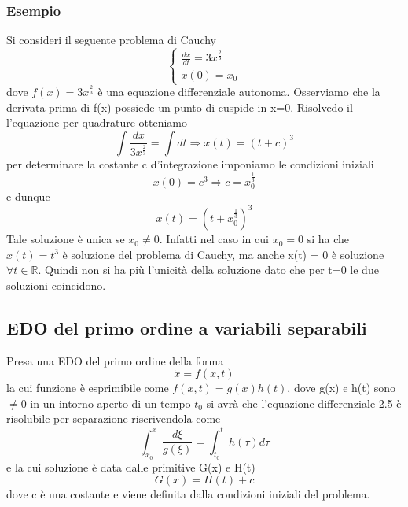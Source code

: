\subsubsection{Esempio}
Si consideri il seguente problema di Cauchy
\begin{equation*}
	\left \{ \begin{array}{l}
		\frac{dx}{dt} = 3x^{\frac{2}{3}} \\[0.2in]
		x(0) = x_0
	\end{array} \right.
\end{equation*}
dove $f(x) = 3x^{\frac{2}{3}}$ \`{e} una equazione differenziale autonoma. Osserviamo che la derivata prima di f(x) possiede un punto di cuspide in x=0. Risolvedo il l'equazione per quadrature otteniamo
\begin{equation*}
	\int \frac{dx}{3x^{\frac{2}{3}}} = \int dt \Rightarrow x(t) = (t+c)^3
\end{equation*}
per determinare la  costante c d'integrazione imponiamo le condizioni iniziali 
\begin{equation*}
	x(0) = c^3 \Rightarrow c = x_0^{\frac{1}{3}}
\end{equation*}
e dunque 
\begin{equation*}
	x(t) = (t + x_{0}^{\frac{1}{3}})^{3}
\end{equation*}
Tale soluzione \`{e} unica se $x_0 \neq 0$. Infatti nel caso in cui $x_0 = 0 $ si ha che $x(t) = t^3$ \`{e} soluzione del problema di Cauchy, ma anche x(t) = 0 \`{e} soluzione $\forall t \in \mathbb{R}$. Quindi non si ha pi\`{u} l'unicit\`{a} della soluzione dato che per t=0 le due soluzioni coincidono.

\subsection{EDO del primo ordine a variabili separabili}

Presa una EDO del primo ordine della forma 
\begin{equation}
	\dot{x} = f(x,t)
\end{equation}
la cui funzione \`{e} esprimibile come $f(x,t) = g(x)h(t)$, dove g(x) e h(t) sono $\neq 0$ in un intorno aperto di un tempo $t_0$ si avr\`{a} che l'equazione differenziale 2.5 \`{e} risolubile per separazione riscrivendola come 
\begin{equation}
	\int_{x_0}^{x} \frac{d\xi}{g(\xi)} = \int_{t_0}^t h(\tau)d\tau
\end{equation}
e la cui soluzione \`{e} data dalle primitive G(x) e H(t) 
\begin{equation*}
	G(x) = H(t) +c
\end{equation*}
dove c \`{e} una costante e viene definita dalla condizioni iniziali del problema.



